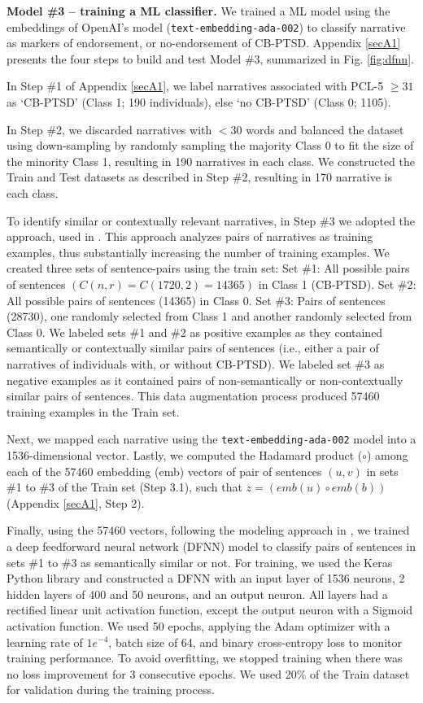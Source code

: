 \documentclass[bst/sn-nature]{sn-jnl}%
\theoremstyle{thmstyleone}%
\theoremstyle{thmstyletwo}%
\theoremstyle{thmstylethree}%
\begin{document}
\textbf{Model \#3 -- training a ML classifier.} 
We trained a ML model using the embeddings of OpenAI's model (\texttt{text-embedding-ada-002}) to classify narrative as markers of endorsement, or no-endorsement of CB-PTSD. 
Appendix \ref{secA1} presents the four steps to build and test Model \#3, summarized in Fig. \ref{fig:dfnn}.

In Step \#1 of Appendix \ref{secA1}, we label narratives associated with PCL-5 $\geq 31$ as `CB-PTSD' (Class 1; 190 individuals), else `no CB-PTSD' (Class 0; 1105).

In Step \#2, we discarded narratives with $< 30$ words and balanced the dataset using down-sampling by randomly sampling the majority Class 0 to fit the size of the minority Class 1, resulting in 190 narratives in each class.
We constructed the Train and Test datasets as described in Step \#2, resulting in 170 narrative is each class.

To identify similar or contextually relevant narratives, in Step \#3 we adopted the approach, used in \cite{bartal2023identifying}.
This approach analyzes pairs of narratives as training examples, thus substantially increasing the number of training examples.
We created three sets of sentence-pairs using the train set:
Set \#1: All possible pairs of sentences $(C(n,r) = C(1720,2) = 14365)$ in Class 1 (CB-PTSD).
Set \#2: All possible pairs of sentences (14365) in Class 0.
Set \#3: Pairs of sentences (28730), one randomly selected from Class 1 and another randomly selected from Class 0.
We labeled sets \#1 and \#2 as positive examples as they contained semantically or contextually similar pairs of sentences (i.e., either a pair of narratives of individuals with, or without CB-PTSD).
We labeled set \#3 as negative examples as it contained pairs of non-semantically or non-contextually similar pairs of sentences. 
This data augmentation process produced 57460 training examples in the Train set.

Next, we mapped each narrative using the \texttt{text-embedding-ada-002} model into a 1536-dimensional vector.
Lastly, we computed the Hadamard product ($\circ$) \cite{davis1962norm} among each of the 57460 embedding (emb) vectors of pair of sentences $(u,v)$ in sets \#1 to \#3 of the Train set (Step 3.1), such that $z=(emb(u) \circ emb(b))$ (Appendix \ref{secA1}, Step 2).

Finally, using the 57460 vectors, following the modeling approach in \cite{bartal2023identifying}, we trained a deep feedforward neural network (DFNN) model to classify pairs of sentences in sets \#1 to \#3 as semantically similar or not.
For training, we used the Keras Python library and constructed a DFNN with an input layer of 1536 neurons, 2 hidden layers of 400 and 50 neurons, and an output neuron.
All layers had a rectified linear unit activation function, except the output neuron with a Sigmoid activation function.
We used 50 epochs, applying the Adam optimizer with a learning rate of $1e^{-4}$, batch size of 64, and binary cross-entropy loss to monitor training performance.
To avoid overfitting, we stopped training when there was no loss improvement for 3 consecutive epochs.
We used 20\% of the Train dataset for validation during the training process.
\end{document}
